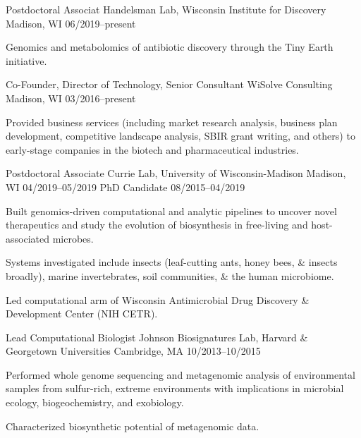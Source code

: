 

\begin{cventries}
  \cventry
    {Postdoctoral Associat} %
    {Handelsman Lab, Wisconsin Institute for Discovery} %
    {Madison, WI} %
    {06/2019--present} %
    {
      \begin{cvitems} %
        \item {Genomics and metabolomics of antibiotic discovery through the Tiny Earth initiative.}
      \end{cvitems}
    }
  \cventry
    {Co-Founder, Director of Technology, Senior Consultant} %
    {WiSolve Consulting} %
    {Madison, WI} %
    {03/2016--present} %
    {
      \begin{cvitems} %
        \item {Provided business services (including market research analysis, business plan development, competitive landscape analysis, SBIR grant writing, and others) to early-stage companies in the biotech and pharmaceutical industries.}
      \end{cvitems}
    }
  \vspace{0.4cm}
  \cventry
	{Postdoctoral Associate}
	{Currie Lab, University of Wisconsin-Madison}
	{Madison, WI}
	{04/2019--05/2019}
	{}
  \vspace{-0.4cm}	
  \cventry
    {PhD Candidate} %
    {} %
    {} %
    {08/2015--04/2019} %
    {
      \begin{cvitems} %
        \item {Built genomics-driven computational and analytic pipelines to uncover novel therapeutics and study the evolution of biosynthesis in free-living and host-associated microbes.}
        \item {Systems investigated include insects (leaf-cutting ants, honey bees, \& insects broadly), marine invertebrates, soil communities, \& the human microbiome.}
        \item {Led computational arm of Wisconsin Antimicrobial Drug Discovery \& Development Center (NIH CETR).}
      \end{cvitems}
    }
    
  \cventry
    {Lead Computational Biologist} %
    {Johnson Biosignatures Lab, Harvard \& Georgetown Universities} %
    {Cambridge, MA} %
    {10/2013--10/2015} %
    {
      \begin{cvitems} %
        \item {Performed whole genome sequencing and metagenomic analysis of environmental samples from sulfur-rich, extreme environments with implications in microbial ecology, biogeochemistry, and exobiology.}
        \item {Characterized biosynthetic potential of metagenomic data.}
      \end{cvitems} 
    }
    

\end{cventries}
